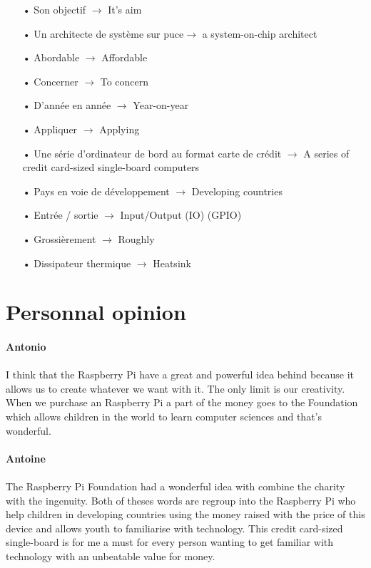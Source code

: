 \documentclass[10pt,a4paper]{article}
\begin{document}
\begin{itemize}
\item[•] Son objectif $\rightarrow$ It's aim
\item[•] Un architecte de système sur puce$\rightarrow$ a system-on-chip architect
\item[•] Abordable $\rightarrow$ Affordable
\item[•] Concerner $\rightarrow$ To concern
\item[•] D'année en année $\rightarrow$ Year-on-year
\item[•] Appliquer $\rightarrow$ Applying
\item[•] Une série d'ordinateur de bord au format carte de crédit $\rightarrow$ A series of credit card-sized single-board computers
\item[•] Pays en voie de développement $\rightarrow$ Developing countries
\item[•] Entrée / sortie $\rightarrow$ Input/Output (IO) (GPIO)
\item[•] Grossièrement $\rightarrow$ Roughly
\item[•] Dissipateur thermique $\rightarrow$ Heatsink
\end{itemize}

\section{Personnal opinion}

\paragraph{Antonio}

\paragraph{}I think that the Raspberry Pi have a great and powerful idea behind because it allows us to create whatever we want with it. The only limit is our creativity. When we purchase an Raspberry Pi a part of the money goes to the Foundation which allows children in the world to learn computer sciences and that’s wonderful.

\paragraph{Antoine}

\paragraph{}The Raspberry Pi Foundation had a wonderful idea with combine the charity with the ingenuity. Both of theses words are regroup into the Raspberry Pi who help children in developing countries using the money raised with the price of this device and allows youth to familiarise with technology. This credit card-sized single-board is for me a must for every person wanting to get familiar with technology with an unbeatable value for money.
\end{document}
